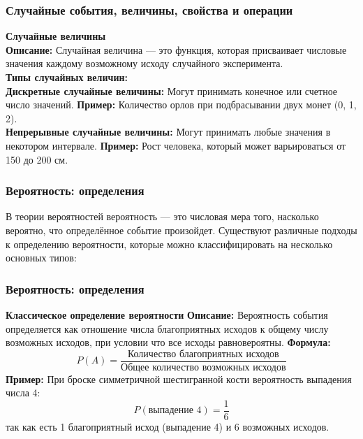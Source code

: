 \documentclass[aspectratio=169]{beamer}
\begin{document}
\begin{frame}
\frametitle{Случайные события, величины, свойства и операции}
\textbf{Случайные величины}
\newline\\
\textbf{Описание:} Случайная величина — это функция, которая присваивает числовые значения каждому возможному исходу случайного эксперимента.
\newline\\
\textbf{Типы случайных величин:}
\newline\\
\textbf{Дискретные случайные величины:} Могут принимать конечное или счетное число значений.
\newline
\textbf{Пример:} Количество орлов при подбрасывании двух монет (0, 1, 2).
\newline\\
\textbf{Непрерывные случайные величины:} Могут принимать любые значения в некотором интервале.
\newline
\textbf{Пример:} Рост человека, который может варьироваться от 150 до 200 см.
\end{frame}

\begin{frame}
\frametitle{Вероятность: определения}
В теории вероятностей вероятность — это числовая мера того, насколько вероятно, что определённое событие произойдет. Существуют различные подходы к определению вероятности, которые можно классифицировать на несколько основных типов:
\end{frame}

\begin{frame}
\frametitle{Вероятность: определения}
\textbf{Классическое определение вероятности}
\newline
\textbf{Описание:} Вероятность события определяется как отношение числа благоприятных исходов к общему числу возможных исходов, при условии что все исходы равновероятны.
\newline
\textbf{Формула:}
  \[
  P(A) = \frac{\text{Количество благоприятных исходов}}{\text{Общее количество возможных исходов}}
  \]
\newline
\textbf{Пример:} При броске симметричной шестигранной кости вероятность выпадения числа 4:
  \[
  P(\text{выпадение 4}) = \frac{1}{6}
  \]
так как есть 1 благоприятный исход (выпадение 4) и 6 возможных исходов.
\end{frame}
\end{document}
